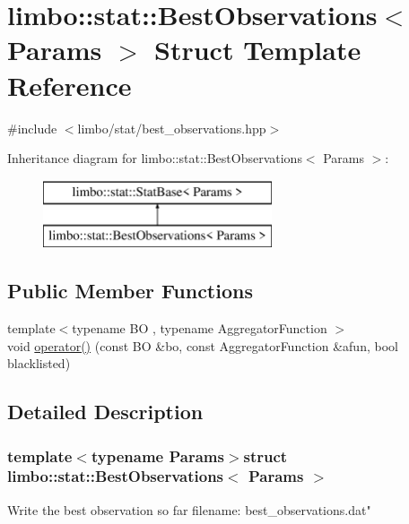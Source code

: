 \hypertarget{structlimbo_1_1stat_1_1_best_observations}{}\section{limbo\+:\+:stat\+:\+:Best\+Observations$<$ Params $>$ Struct Template Reference}
\label{structlimbo_1_1stat_1_1_best_observations}


{\ttfamily \#include $<$limbo/stat/best\+\_\+observations.\+hpp$>$}

Inheritance diagram for limbo\+:\+:stat\+:\+:Best\+Observations$<$ Params $>$\+:\begin{figure}[H]
\begin{center}
\leavevmode
\includegraphics[height=2.000000cm]{structlimbo_1_1stat_1_1_best_observations}
\end{center}
\end{figure}
\subsection*{Public Member Functions}
\begin{DoxyCompactItemize}
\item 
{\footnotesize template$<$typename B\+O , typename Aggregator\+Function $>$ }\\void \hyperlink{structlimbo_1_1stat_1_1_best_observations_a62490e2a957d770d30c8575e1c34ce76}{operator()} (const B\+O \&bo, const Aggregator\+Function \&afun, bool blacklisted)
\end{DoxyCompactItemize}


\subsection{Detailed Description}
\subsubsection*{template$<$typename Params$>$struct limbo\+::stat\+::\+Best\+Observations$<$ Params $>$}

Write the best observation so far filename\+: {\ttfamily best\+\_\+observations.\+dat"} 

